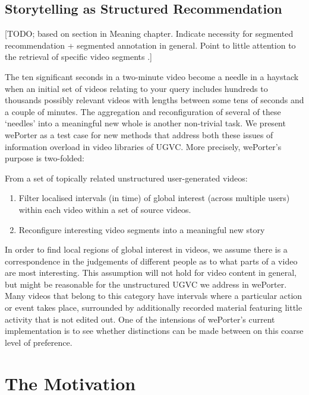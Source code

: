 \subsection{Storytelling as Structured Recommendation}

[TODO; based on section in Meaning chapter. Indicate necessity for segmented recommendation + segmented annotation in general. Point to little attention to the retrieval of specific video segments \cite{Snoek:2009dq}\cite{Kankanhalli:2008uv}.]

The ten significant seconds in a two-minute video become a needle in a haystack when an initial set of videos relating to your query includes hundreds to thousands possibly relevant videos with lengths between some tens of seconds and a couple of minutes. The aggregation and reconfiguration of several of these `needles' into a meaningful new whole is another non-trivial task. We present wePorter as a test case for new methods that address both these issues of information overload in video libraries of UGVC. More precisely, wePorter's purpose is two-folded:

From a set of topically related unstructured user-generated videos:
\begin{enumerate}
  \item Filter localised intervals (in time) of global interest (across multiple users) within each video within a set of source videos.
  \item Reconfigure interesting video segments into a meaningful new story
\end{enumerate}		

In order to find local regions of global interest in videos, we assume there is a correspondence in the judgements of different people as to what parts of a video are most interesting. This assumption will not hold for video content in general, but might be reasonable for the unstructured UGVC we address in wePorter. Many videos that belong to this category have intervals where a particular action or event takes place, surrounded by additionally recorded material featuring little activity that is not edited out. One of the intensions of wePorter's current implementation is to see whether distinctions can be made between on this coarse level of preference.

\section{The Motivation}
\label{sec:weporter_motivation}

